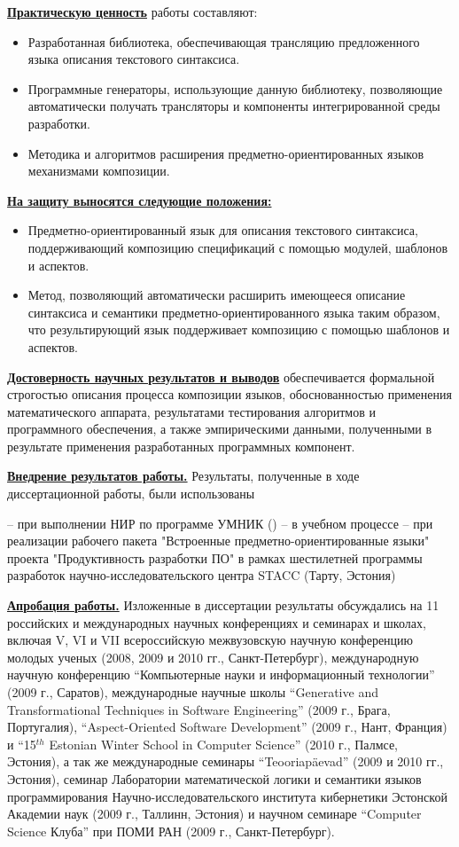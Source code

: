 \documentclass[12pt,a4paper]{article}
\newcommand{\afsubsection}[1]{\par \textbf{\underline{#1}}}
\begin{document}
\afsubsection{Практическую ценность} работы составляют:
\begin{itemize}
\item Разработанная библиотека, обеспечивающая трансляцию предложенного языка описания текстового синтаксиса.
\item Программные генераторы, использующие данную библиотеку, позволяющие автоматически получать трансляторы и компоненты интегрированной среды разработки.
\item Методика и алгоритмов расширения предметно-ориентированных языков механизмами композиции.
\end{itemize}

\afsubsection{На защиту выносятся следующие положения:} 
\begin{itemize}
\item Предметно-ориентированный язык для описания текстового синтаксиса, поддерживающий композицию спецификаций с помощью модулей, шаблонов и аспектов.
\item Метод, позволяющий автоматически расширить имеющееся описание синтаксиса и семантики предметно-ориентированного языка таким образом, что результирующий язык поддерживает композицию с помощью шаблонов и аспектов.
\end{itemize}

\afsubsection{Достоверность научных результатов и выводов} обеспечивается формальной строгостью описания процесса композиции языков, обоснованностью применения математического аппарата, результатами тестирования алгоритмов и программного обеспечения, а также эмпирическими данными, полученными в результате применения разработанных программных компонент.

\afsubsection{Внедрение результатов работы.} Результаты, полученные в ходе диссертационной работы, были использованы 

-- при выполнении НИР по программе УМНИК ()
-- в учебном процессе 
-- при реализации рабочего пакета "Встроенные предметно-ориентированные языки" проекта "Продуктивность разработки ПО" в рамках шестилетней программы разработок научно-исследовательского центра STACC (Тарту, Эстония)

\afsubsection{Апробация работы.} Изложенные в диссертации результаты обсуждались на 11 российских и международных научных конференциях и семинарах и школах, включая V, VI и VII всероссийскую межвузовскую научную конференцию молодых ученых (2008, 2009 и 2010 гг., Санкт-Петербург), международную научную конференцию ``Компьютерные науки и информационный технологии'' (2009 г., Саратов), международные научные школы ``Generative and Transformational Techniques in Software Engineering'' (2009 г., Брага, Португалия), ``Aspect-Oriented Software Development'' (2009 г., Нант, Франция) и ``15$^{th}$ Estonian Winter School in Computer Science'' (2010 г., Палмсе, Эстония), а так же международные семинары ``Teooriapäevad'' (2009 и 2010 гг., Эстония), семинар Лаборатории математической логики и семантики языков программирования Научно-исследовательского института кибернетики Эстонской Академии наук (2009 г., Таллинн, Эстония) и научном семинаре ``Computer Science Клуба'' при ПОМИ РАН (2009 г., Санкт-Петербург).
\end{document}
